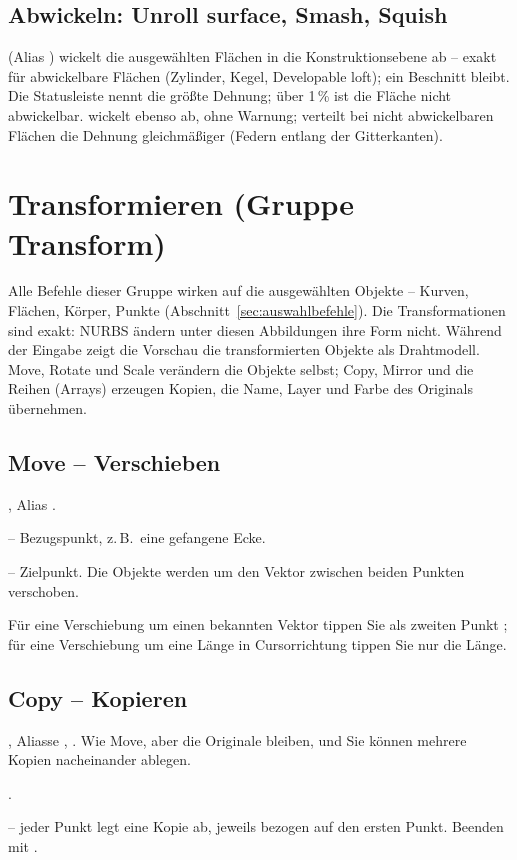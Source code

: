 \subsection{Abwickeln: Unroll surface, Smash, Squish}\label{sec:cmd-unroll}
 (Alias ) wickelt die ausgewählten Flächen in die Konstruktionsebene ab
-- exakt für abwickelbare Flächen (Zylinder, Kegel, Developable loft); ein Beschnitt bleibt. Die
Statusleiste nennt die größte Dehnung; über 1\,\% ist die Fläche nicht abwickelbar.
 wickelt ebenso ab, ohne Warnung;  verteilt bei nicht abwickelbaren Flächen
die Dehnung gleichmäßiger (Federn entlang der Gitterkanten).

\section{Transformieren (Gruppe Transform)}\label{sec:gruppe-transform}

Alle Befehle dieser Gruppe wirken auf die ausgewählten Objekte -- Kurven, Flächen, Körper,
Punkte (Abschnitt~\ref{sec:auswahlbefehle}). Die Transformationen sind exakt: NURBS ändern
unter diesen Abbildungen ihre Form nicht. Während der Eingabe zeigt die Vorschau die
transformierten Objekte als Drahtmodell. Move, Rotate und Scale verändern die Objekte selbst;
Copy, Mirror und die Reihen (Arrays) erzeugen Kopien, die Name, Layer und Farbe des Originals
übernehmen.

\subsection{Move -- Verschieben}\label{sec:cmd-move}
, Alias .
\begin{schritte}
\item {} -- Bezugspunkt, z.\,B.\ eine gefangene Ecke.
\item {} -- Zielpunkt. Die Objekte werden um den Vektor zwischen
  beiden Punkten verschoben.
\end{schritte}
Für eine Verschiebung um einen bekannten Vektor tippen Sie als zweiten Punkt ;
für eine Verschiebung um eine Länge in Cursorrichtung tippen Sie nur die Länge.

\subsection{Copy -- Kopieren}\label{sec:cmd-copy}
, Aliasse , . Wie Move, aber die Originale bleiben, und Sie können
mehrere Kopien nacheinander ablegen.
\begin{schritte}
\item {}.
\item {} -- jeder Punkt legt eine Kopie ab, jeweils
  bezogen auf den ersten Punkt. Beenden mit .
\end{schritte}

